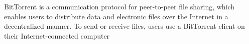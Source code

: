 BitTorrent is a communication protocol for peer-to-peer file sharing, which enables users to distribute data and electronic files over the Internet in a decentralized manner. To send or receive files, users use a BitTorrent client on their Internet-connected computer